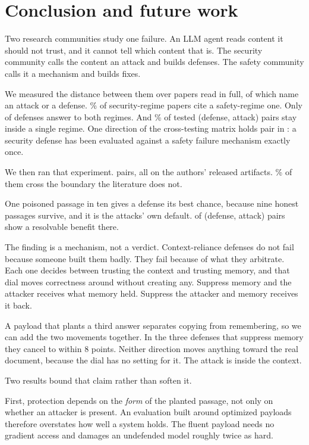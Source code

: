 \section{Conclusion and future work}
\label{sec:conclusion}

Two research communities study one failure. An LLM agent reads content it
should not trust, and it cannot tell which content that is. The security
community calls the content an attack and builds defenses. The safety community calls it a mechanism and builds fixes.

We measured the distance between them over \NCorpus{} papers read in full,
of which \NAnalysed{} name an attack or a defense.
\PctSecCitesSafety{}\% of security-regime papers cite a safety-regime one. Only \NBothValidated{} of \NDefenses{} defenses answer
to both regimes. And \PctSameRegime{}\% of
tested (defense, attack) pairs stay inside a single regime. One direction of the
cross-testing matrix holds \NSecDefVsSafetyAttack{} pair in \NPureRegimePairs{}: a
security defense has been evaluated against a safety failure
mechanism exactly once.

We then ran that experiment. \NCampaignPairs{} pairs, all on the authors'
released artifacts. \PctCampCross{}\% of them cross the boundary the
literature does not.

One poisoned passage in ten gives a defense its best chance, because nine
honest passages survive, and it is the attacks' own default.
\NGridLowHelps{} of \NGridLowPairs{} (defense, attack) pairs show a
resolvable benefit there.

The finding is a mechanism, not a verdict. Context-reliance defenses do not
fail because someone built them badly. They fail because of what they
arbitrate. Each one decides between trusting the context and trusting memory,
and that dial moves correctness around without creating any. Suppress memory
and the attacker receives what memory held. Suppress the attacker and memory
receives it back.

A payload that plants a third answer separates copying from remembering, so
we can add the two movements together. In the three defenses that suppress
memory they cancel to within 8 points. Neither direction moves anything
toward the real document, because the dial has no setting for it. The attack
is inside the context.

Two results bound that claim rather than soften it.

First, protection depends on the \emph{form} of the planted passage, not only
on whether an attacker is present. An evaluation built around optimized
payloads therefore overstates how well a system holds. The fluent payload
needs no gradient access and damages an undefended model roughly twice as
hard.

